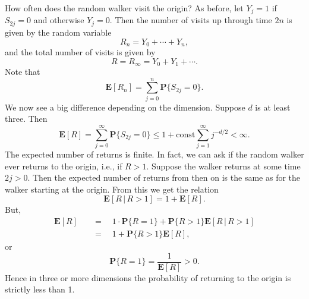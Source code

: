 \documentclass{stml-l}
\theoremstyle{definition}
\numberwithin{equation}{chapter}
\numberwithin{figure}{chapter}
\numberwithin{figure}{section}
\begin{document}
How often does the random walker visit the origin? As before, let
$Y_{j}=1$ if $S_{2j}=0$ and otherwise $Y_{j}=0$. Then the number of
visits up through time $2n$ is given by the random variable
\begin{equation*}
R_{n}=Y_{0}+\cdots+Y_{n},
\end{equation*}
and the total number of visits is given by
\begin{equation*}
 R=R_{\infty}=Y_{0}+Y_{1}+\cdots.
\end{equation*}
Note that
\begin{equation*}
\mathbf{E}[R_{n}]=\sum\limits_{j=0}^{n}\mathbf{P}\{S_{2j}=0\}.
\end{equation*}
We now see a big difference depending on the dimension. Suppose $d$
is at least three. Then
\begin{equation*}
\mathbf{E}[R]=\sum\limits_{j=0}^{\infty}\mathbf{P}\{S_{2j}=0\}\leq
1+ \mathrm{const} \sum\limits_{j=1}^{\infty}j^{-d/2}<\infty.
\end{equation*}
The expected number of returns is finite. In fact, we can ask if the
random walker ever returns to the origin, i.e., if $R>1$. Suppose
the walker returns at some time $2j>0$. Then the expected number of
returns from then on is the same as for the walker starting at the
origin. From this we get the relation
\begin{equation*}
\mathbf{E}[R\,|\,R>1]=1+\mathbf{E}[R].
\end{equation*}
But,
\begin{align*}
\mathbf{E}[R]\quad &=\quad 1\cdot
\mathbf{P}\{R=1\}+\mathbf{P}\{R>1\}\mathbf{E}[R\,|\,R>1]\\
&=\quad 1+\mathbf{P}\{R>1\}\mathbf{E}[R],
\end{align*}
or
\begin{equation*}
\mathbf{P}\{R=1\}=\frac{1}{\mathbf{E}[R]}>0.
\end{equation*}
Hence in three or more dimensions the probability of returning to
the origin is strictly less than 1.
\end{document}
